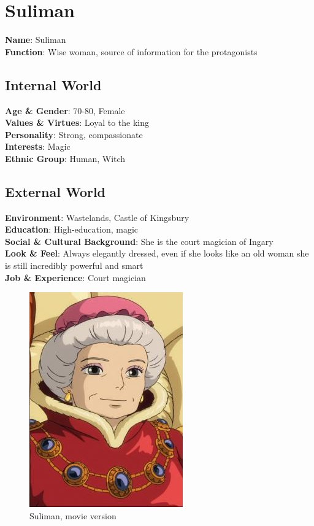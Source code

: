 \section{Suliman}

\begin{minipage}{0.5\textwidth}
\textbf{Name}: Suliman\\
\textbf{Function}: Wise woman, source of information for the protagonists

\subsection{Internal World}

\textbf{Age \& Gender}: 70-80, Female \\
\textbf{Values \& Virtues}: Loyal to the king \\
\textbf{Personality}: Strong, compassionate\\
\textbf{Interests}: Magic \\
\textbf{Ethnic Group}: Human, Witch

\subsection{External World}
\textbf{Environment}: Wastelands, Castle of Kingsbury \\
\textbf{Education}: High-education, magic \\
\textbf{Social \& Cultural Background}: She is the court magician of Ingary \\
\textbf{Look \& Feel}: Always elegantly dressed, even if she looks like an old woman she is still incredibly powerful and smart \\
\textbf{Job \& Experience}: Court magician \\

\end{minipage}%
%
\hfill\begin{minipage}{0.4\textwidth}
  \begin{figure}[H]
  \includegraphics{Images/Characters/suliman}
  \caption{Suliman, movie version}
\end{figure}
\end{minipage}

